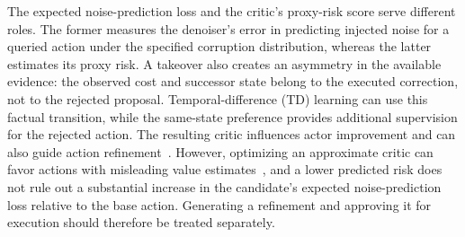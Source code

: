\documentclass[9pt,journal]{IEEEtran}
\begin{document}
The expected noise-prediction loss and the critic's proxy-risk score
serve different roles. The former measures the denoiser's error in
predicting injected noise for a queried action under the specified
corruption distribution, whereas the latter estimates its proxy risk. A takeover also creates an
asymmetry in the available evidence: the observed cost and successor
state belong to the executed correction, not to the rejected proposal.
Temporal-difference (TD) learning can use this factual transition, while
the same-state preference provides additional supervision for the
rejected action. The resulting critic influences actor improvement and
can also guide action refinement~\cite{lu2023cep}. However, optimizing
an approximate critic can favor actions with misleading value
estimates~\cite{fujimoto2018td3}, and a lower predicted risk does not rule out a substantial increase in the candidate's expected noise-prediction loss relative to the base action. Generating a refinement and
approving it for execution should therefore be treated separately.
\end{document}
